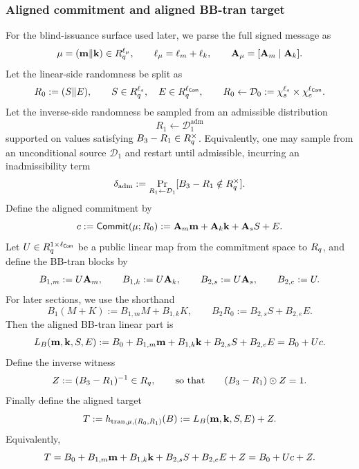 \subsubsection{Aligned commitment and aligned BB-tran target}
\label{subsec:aligned-hiding}
For the blind-issuance surface used later, we parse the full signed message as
\[
\mathbf{\mu}=(\mathbf{m}\Vert \mathbf{k})\in R_q^{\ell_\mu},
\qquad
\ell_\mu=\ell_m+\ell_k,
\qquad
\mathbf{A}_\mu=[\mathbf{A}_m\mid \mathbf{A}_k].
\]
Let the linear-side randomness be split as
\[
R_0:=(S\Vert E),
\qquad
S\in R_q^{\ell_s},\quad E\in R_q^{\ell_{\mathsf{Com}}},
\qquad
R_0\gets \mathcal D_0:=\chi_s^{\ell_s}\times \chi_e^{\ell_{\mathsf{Com}}}.
\]
Let the inverse-side randomness be sampled from an admissible distribution
\[
R_1\gets \mathcal D_1^{\mathrm{adm}}
\]
supported on values satisfying \(B_3-R_1\in R_q^\times\). Equivalently, one may sample from an unconditional
source \(\mathcal D_1\) and restart until admissible, incurring an inadmissibility term
\[
\delta_{\mathrm{adm}}:=\Pr_{R_1\gets \mathcal D_1}[B_3-R_1\notin R_q^\times].
\]
Define the aligned commitment by
\begin{equation}\label{eq:aligned-commitment}
  c
  := \mathsf{Commit}(\mathbf{\mu};R_0)
  := \mathbf{A}_m\mathbf{m} + \mathbf{A}_k\mathbf{k} + \mathbf{A}_s S + E.
\end{equation}
Let \(U\in R_q^{1\times \ell_{\mathsf{Com}}}\) be a public linear map from the commitment space to \(R_q\), and
define the BB-tran blocks by
\begin{equation}\label{eq:aligned-blocks}
B_{1,m}:=U\mathbf{A}_m,
\qquad
B_{1,k}:=U\mathbf{A}_k,
\qquad
B_{2,s}:=U\mathbf{A}_s,
\qquad
B_{2,e}:=U.
\end{equation}
For later sections, we use the shorthand
\[
B_1(M+K):=B_{1,m}M+B_{1,k}K,
\qquad
B_2R_0:=B_{2,s}S+B_{2,e}E.
\]
Then the aligned BB-tran linear part is
\begin{equation}\label{eq:aligned-linear-part}
L_B(\mathbf{m},\mathbf{k},S,E)
:= B_0 + B_{1,m}\mathbf{m} + B_{1,k}\mathbf{k} + B_{2,s}S + B_{2,e}E
= B_0 + Uc.
\end{equation}
Define the inverse witness
\begin{equation}\label{eq:aligned-inverse}
Z:=(B_3-R_1)^{-1}\in R_q,
\qquad\text{so that}\qquad
(B_3-R_1)\odot Z = 1.
\end{equation}
Finally define the aligned target
\begin{equation}\label{eq:aligned-target}
T
:= h_{\mathrm{tran},\mathbf{\mu},(R_0,R_1)}(B)
:= L_B(\mathbf{m},\mathbf{k},S,E)+Z.
\end{equation}
Equivalently,
\begin{equation}\label{eq:aligned-target-public}
T = B_0 + B_{1,m}\mathbf{m} + B_{1,k}\mathbf{k} + B_{2,s}S + B_{2,e}E + Z = B_0 + Uc + Z.
\end{equation}

